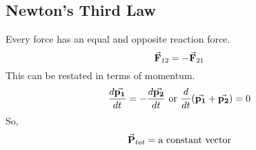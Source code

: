     \subsection*{Newton's Third Law}
        Every force has an equal and opposite reaction force.
        \begin{equation*}
            \va{F}_{12} = -\va{F}_{21}
        \end{equation*}
        This can be restated in terms of momentum.
        \begin{equation*}
            \frac{d\va{p_1}}{dt} = -\frac{d\va{p_2}}{dt} \text{ or } \frac{d}{dt} (\va{p_1} + \va{p_2}) = 0
        \end{equation*}
        So,
        \begin{equation*}
            \va{P}_{tot} = \text{a constant vector}
        \end{equation*}